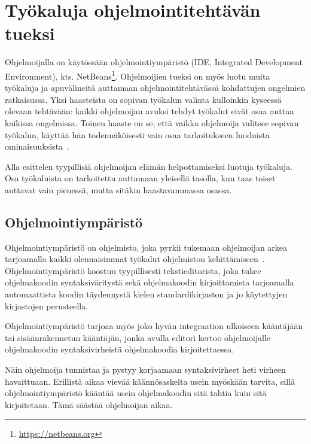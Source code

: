 \documentclass[finnish]{tktltiki2}
\theoremstyle{definition}
\theoremstyle{remark}
\begin{document}

\section{Työkaluja ohjelmointitehtävän tueksi}
\label{section:tokatk}
Ohjelmoijalla on käytössään ohjelmointiympäristö (IDE, Integrated Development Environment), kts. NetBeans\footnote{\url{https://netbeans.org}}. Ohjelmoijien tueksi on myös luotu muita työkaluja ja apuvälineitä auttamaan ohjelmointitehtävässä kohdattujen ongelmien ratkaisussa.
Yksi haasteista on sopivan työkalun valinta kulloinkin kyseessä olevaan tehtävään: kaikki ohjelmoijan avuksi tehdyt työkalut eivät osaa auttaa kaikissa ongelmissa. Toinen haaste on se, että vaikka ohjelmoija valitsee sopivan työkalun, käyttää hän todennäköisesti vain osaa tarkoitukseen luoduista ominaisuuksista~\cite{whyline}.

Alla esittelen tyypillisiä ohjelmoijan elämän helpottamiseksi luotuja työkaluja. Osa työkaluista on tarkoitettu auttamaan yleisellä tasolla, kun taas toiset auttavat vain pienessä, mutta sitäkin haastavammassa osassa.

\subsection{Ohjelmointiympäristö}
Ohjelmointiympäristö on ohjelmisto, joka pyrkii tukemaan ohjelmoijan arkea tarjoamalla kaikki olennaisimmat työkalut ohjelmiston kehittämiseen~\cite{eclipse-ide}. Ohjelmointiympäristö koostuu tyypillisesti tekstieditorista, joka tukee ohjelmakoodin syntaksiväritystä sekä ohjelmakoodin kirjoittamista tarjoamalla automaattista koodin täydennystä kielen standardikirjaston ja jo käytettyjen kirjastojen perusteella.

Ohjelmointiympäristö tarjoaa myös joko hyvän integraation ulkoiseen kääntäjään tai sisäänrakennetun kääntäjän, jonka avulla editori kertoo ohjelmoijalle ohjelmakoodin syntaksivirheistä ohjelmakoodia kirjoitettaessa.

Näin ohjelmoija tunnistaa ja pystyy korjaamaan syntaksivirheet heti virheen havaittuaan. Erillistä aikaa vievää käännösaskelta usein myöskään tarvita, sillä ohjelmointiympäristö kääntää usein ohjelmakoodin sitä tahtia kuin sitä kirjoitetaan. Tämä säästää ohjelmoijan aikaa.
\end{document}
